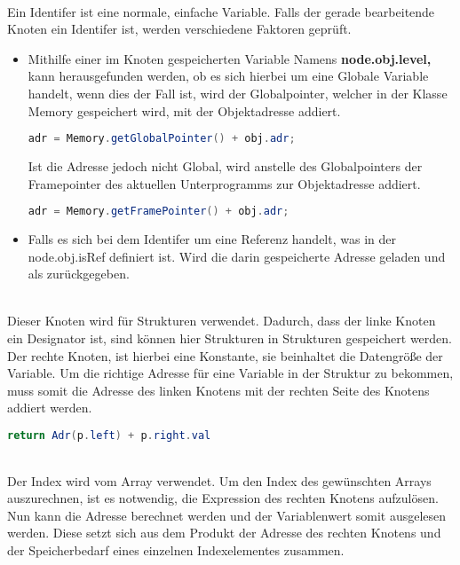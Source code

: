 \\
Ein Identifer ist eine normale, einfache Variable. Falls der gerade bearbeitende Knoten ein Identifer ist, werden verschiedene Faktoren geprüft.
\begin{itemize}
 \item Mithilfe einer im Knoten gespeicherten Variable Namens \textbf{node.obj.level,} kann herausgefunden werden, ob es sich hierbei um eine Globale Variable handelt, wenn dies der Fall ist, wird der Globalpointer, welcher in der Klasse Memory gespeichert wird, mit der Objektadresse addiert.
 \begin{lstlisting}[language=JAVA]
 adr = Memory.getGlobalPointer() + obj.adr;	
  \end{lstlisting}
Ist die Adresse jedoch nicht Global, wird anstelle des Globalpointers der Framepointer des aktuellen Unterprogramms zur Objektadresse addiert.
   \begin{lstlisting}[language=JAVA]
 adr = Memory.getFramePointer() + obj.adr;
  \end{lstlisting}
 \item Falls es sich bei dem Identifer um eine Referenz handelt, was in der node.obj.isRef definiert ist. Wird die darin gespeicherte Adresse geladen und als zurückgegeben.
\end{itemize}

\\
Dieser Knoten wird für Strukturen verwendet. Dadurch, dass der linke Knoten ein Designator ist, sind können hier Strukturen in Strukturen gespeichert werden. Der rechte Knoten, ist hierbei eine Konstante, sie beinhaltet die Datengröße der Variable. Um die richtige Adresse für eine Variable in der Struktur zu bekommen, muss somit die Adresse des linken
Knotens mit der rechten Seite des Knotens addiert werden.

\begin{lstlisting}[language=JAVA]
return Adr(p.left) + p.right.val
\end{lstlisting}

\\
Der Index wird vom Array verwendet. Um den Index des gewünschten Arrays auszurechnen, ist es notwendig, die Expression des rechten Knotens aufzulösen.
Nun kann die Adresse berechnet werden und der Variablenwert somit ausgelesen werden. Diese setzt sich aus dem Produkt der Adresse des rechten Knotens und der Speicherbedarf eines einzelnen Indexelementes zusammen.

